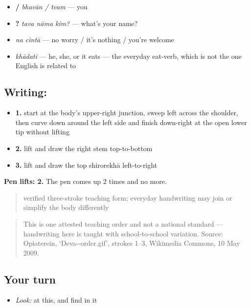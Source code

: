 \begin{itemize}
\raggedright
  \item \textbf{ / } \emph{bhavān / tvam} — you
  \item \textbf{  ?} \emph{tava nāma kim?} — what's your name?
  \item \textbf{ } \emph{na cintā} — no worry / it's nothing / you're welcome
  \item \textbf{} \emph{khādati} — he, she, or it eats — the everyday eat-verb, which is not the one English is related to
\end{itemize}

\subsection*{Writing: }

\begin{itemize}
\raggedright
  \item \textbf{1.} start at the body's upper-right junction, sweep left across the shoulder, then curve down around the left side and finish down-right at the open lower tip without lifting
  \item \textbf{2.} lift and draw the right stem top-to-bottom
  \item \textbf{3.} lift and draw the top shirorekhā left-to-right
\end{itemize}

\textbf{Pen lifts: 2.} The pen comes up 2 times and no more.

\begin{quote}
verified three-stroke teaching form; everyday handwriting may join or simplify the body differently
\end{quote}

\begin{quote}
This is one attested teaching order and not a national standard — handwriting here is taught with school-to-school variation. Source: Opiaterein, ‘Deva--order.gif’, strokes 1–3, Wikimedia Commons, 10 May 2009.
\end{quote}

\subsection*{Your turn}
\begin{itemize}
\raggedright
  \item \emph{Look:} at this, and find  in it
\end{itemize}

